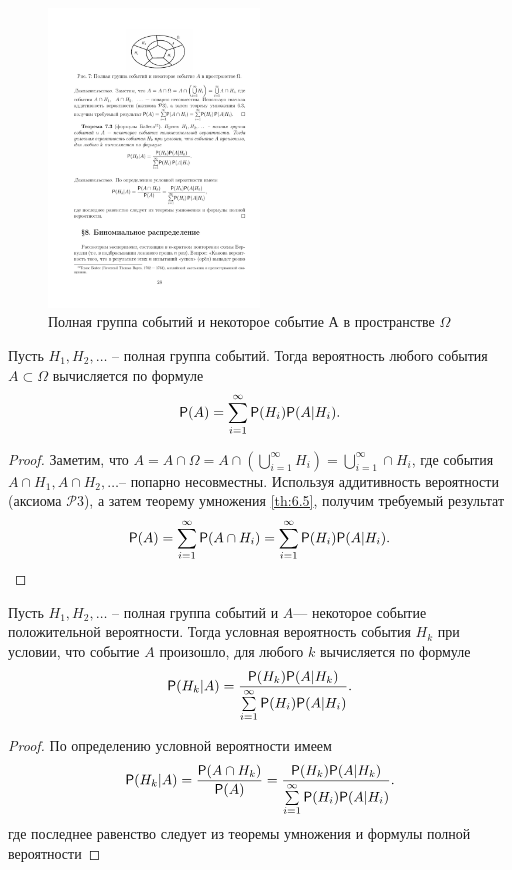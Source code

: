 \begin{figure}[H]
	\centering
	\includegraphics[width=0.5\textwidth]{pic/pic7.pdf}
	\caption{Полная группа событий и некоторое событие А в пространстве $\Omega$}
	\label{fig7}
\end{figure}

\begin{theorem}
\label{th:7.2}
Пусть $H_1,H_2,\dots$ – полная группа
событий. Тогда  вероятность любого события $A\subset \Omega$ вычисляется по формуле
\begin{equation*}
	\P(A)=\sum\limits_{i=1}^{\infty}\P(H_i)\P(A|H_i).
\end{equation*}
\end{theorem}
\begin{proof}
	Заметим, что $A=A\cap\Omega=A\cap\left(\bigcup\limits^{\infty}_{i=1}H_i\right)=\bigcup\limits_{i=1}^{\infty}\cap H_i$, где события $A\cap H_1,A\cap H_2,\dots$-- попарно несовместны. Используя аддитивность вероятности (аксиома $\mathcal{P}3$), а затем теорему умножения \ref{th:6.5}, получим требуемый результат
	\begin{equation*}
		\P(A)=\sum\limits_{i=1}^{\infty}\P(A\cap H_i)=
		\sum\limits_{i=1}^{\infty}\P(H_i)\P(A|H_i).
	\end{equation*}
\end{proof}

\begin{theorem}
\label{th:7.3}
Пусть $H_1,H_2,\dots$ – полная группа
событий и $A $— некоторое событие положительной вероятности. Тогда
условная вероятность события $H_k$ при условии, что событие $A$ произошло,
для любого $k$ вычисляется по формуле
\begin{equation*}
	\P(H_k|A)=\frac{\P(H_k)\P(A|H_k)}{\sum\limits_{i=1}^{\infty}\P(H_i)\P(A|H_i)}.
\end{equation*}
\end{theorem}

\begin{proof}
	По определению условной вероятности имеем
	\begin{equation*}
		\P(H_k|A)=\frac{\P(A\cap H_k)}{\P(A)}=\frac{\P(H_k)\P(A|H_k)}
		{\sum\limits_{i=1}^{\infty}\P(H_i)\P(A|H_i)}.
	\end{equation*}
где последнее равенство следует из теоремы умножения и формулы полной
вероятности
\end{proof}